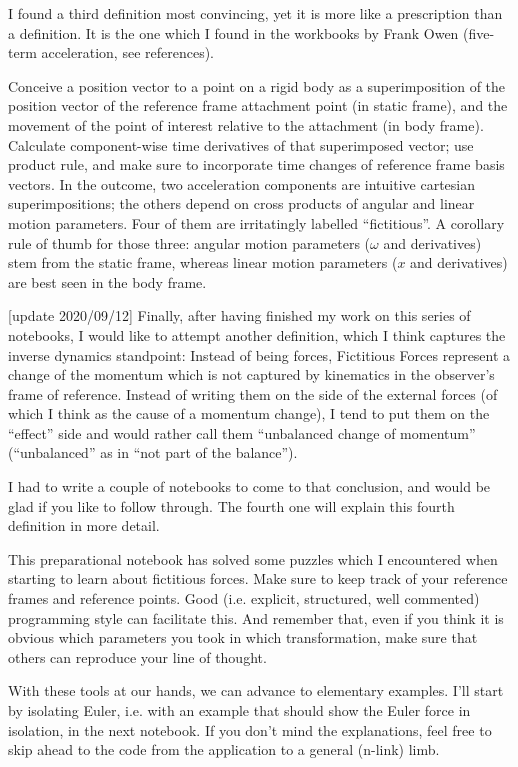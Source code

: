 I found a third definition most convincing, yet it is more like a prescription than a definition. It is the one which I found in the workbooks by Frank Owen (five-term acceleration, see references).

Conceive a position vector to a point on a rigid body as a superimposition of the position vector of the reference frame attachment point (in static frame), and the movement of the point of interest relative to the attachment (in body frame).
Calculate component-wise time derivatives of that superimposed vector; use product rule, and make sure to incorporate time changes of reference frame basis vectors.
In the outcome, two acceleration components are intuitive cartesian superimpositions; the others depend on cross products of angular and linear motion parameters. Four of them are irritatingly labelled “fictitious”.
A corollary rule of thumb for those three: angular motion parameters (\(\omega\) and derivatives) stem from the static frame, whereas linear motion parameters (\(x\) and derivatives) are best seen in the body frame.

[update 2020/09/12] Finally, after having finished my work on this series of notebooks, I would like to attempt another definition, which I think captures the inverse dynamics standpoint: Instead of being forces, Fictitious Forces represent a change of the momentum which is not captured by kinematics in the observer’s frame of reference. Instead of writing them on the side of the external forces (of which I think as the cause of a momentum change), I tend to put them on the “effect” side and would rather call them “unbalanced change of momentum” (“unbalanced” as in “not part of the balance”).

I had to write a couple of notebooks to come to that conclusion, and would be glad if you like to follow through. The fourth one will explain this fourth definition in more detail.

This preparational notebook has solved some puzzles which I encountered when starting to learn about fictitious forces. Make sure to keep track of your reference frames and reference points. Good (i.e. explicit, structured, well commented) programming style can facilitate this. And remember that, even if you think it is obvious which parameters you took in which transformation, make sure that others can reproduce your line of thought.

With these tools at our hands, we can advance to elementary examples. I’ll start by isolating Euler, i.e. with an example that should show the Euler force in isolation, in the next notebook. If you don’t mind the explanations, feel free to skip ahead to the code from the application to a general (n-link) limb.


